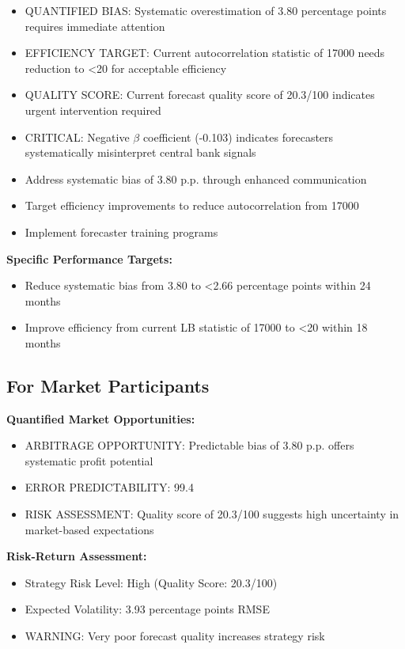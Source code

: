 \documentclass[11pt,a4paper]{article}
\begin{document}
\begin{itemize}
\item QUANTIFIED BIAS: Systematic overestimation of 3.80 percentage points requires immediate attention
\item EFFICIENCY TARGET: Current autocorrelation statistic of 17000 needs reduction to <20 for acceptable efficiency
\item QUALITY SCORE: Current forecast quality score of 20.3/100 indicates urgent intervention required
\item CRITICAL: Negative $\beta$ coefficient (-0.103) indicates forecasters systematically misinterpret central bank signals
\item Address systematic bias of 3.80 p.p. through enhanced communication
\item Target efficiency improvements to reduce autocorrelation from 17000
\item Implement forecaster training programs
\end{itemize}

\textbf{Specific Performance Targets:}
\begin{itemize}
\item Reduce systematic bias from 3.80 to <2.66 percentage points within 24 months
\item Improve efficiency from current LB statistic of 17000 to <20 within 18 months
\end{itemize}

\subsection{For Market Participants}
\textbf{Quantified Market Opportunities:}

\begin{itemize}
\item ARBITRAGE OPPORTUNITY: Predictable bias of 3.80 p.p. offers systematic profit potential
\item ERROR PREDICTABILITY: 99.4%
\item RISK ASSESSMENT: Quality score of 20.3/100 suggests high uncertainty in market-based expectations
\end{itemize}

\textbf{Risk-Return Assessment:}
\begin{itemize}
\item Strategy Risk Level: High (Quality Score: 20.3/100)
\item Expected Volatility: 3.93 percentage points RMSE
\item \textcolor{academicred}{WARNING: Very poor forecast quality increases strategy risk}
\end{itemize}
\end{document}
